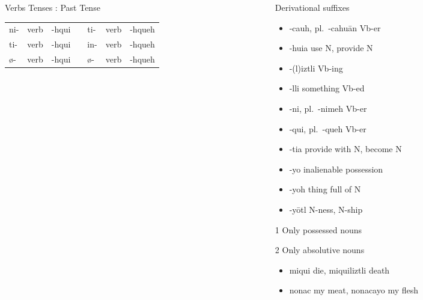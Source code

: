 \documentclass[12pt]{beamer}
\newcommand{\nah}[1]{\textcolor{nahgrn}{#1}}
\newcommand{\trs}[1]{\textcolor{nahblu}{#1}}
\begin{document}
\begin{frame}
\begin{columns}[t]
\begin{column}{.26\linewidth}
\begin{block}{Verbs Tenses : Past Tense}
\begin{enumerate}
\begin{tabular}[t]{lllllll}
      			\nah{ni-}   & verb & \trs{-hqui}   & \vline & \nah{ti-}   & verb & \trs{-hqueh} \\
      			\nah{ti-}   & verb & \trs{-hqui}   & \vline & \nah{in-}   & verb & \trs{-hqueh} \\
      			\nah{ø-}    & verb & \trs{-hqui}   & \vline & \nah{ø-}    & verb & \trs{-hqueh} \\
      		\end{tabular}%
      	\end{enumerate}
      \end{block}
    \end{column}
    \begin{column}{.20\linewidth}
      \begin{block}{Derivational suffixes}
      	\begin{threeparttable}
      		\begin{itemize}
      			\item \nah{-cauh}, pl.~\nah{-cahuān}  \trs{Vb-er}
      			\item \nah{-huia} \trs{use N, provide N}
      			\item \nah{-(l)iztli} \trs{Vb-ing}
      			\item \nah{-lli} \trs{something Vb-ed}
      			\item \nah{-ni}, pl.~\nah{-nimeh}  \trs{Vb-er}
      			\item \nah{-qui}, pl.~\nah{-queh}  \trs{Vb-er}
      			\item \nah{-tia} \trs{provide with N, become N}
      			\item \nah{-yo} inalienable possession
      			\item \nah{-yoh} \trs{thing full of N}
      			\item \nah{-yōtl} \trs{N-ness, N-ship}
      		\end{itemize}
      		\begin{tablenotes}
      			\item[1] Only possessed nouns
      			\item[2] Only absolutive nouns
      		\end{tablenotes}
      	\end{threeparttable}
      \end{block}
      \begin{example}
      	\begin{itemize}
      		\item \nah{miqui} \trs{die}, \nah{miquiliztli} \trs{death}
      		\item \nah{nonac} \trs{my meat}, \nah{nonacayo} \trs{my flesh}

\end{itemize}
\end{example}
\end{column}
\end{columns}
\end{frame}
\end{document}
